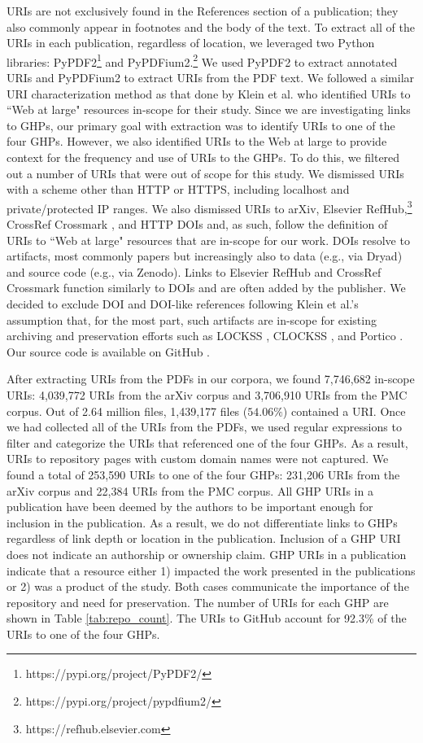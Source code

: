 URIs are not exclusively found in the References section of a publication; they also commonly appear in footnotes and the body of the text. To extract all of the URIs in each publication, regardless of location, we leveraged two Python libraries: PyPDF2\footnote{https://pypi.org/project/PyPDF2/} and PyPDFium2.\footnote{https://pypi.org/project/pypdfium2/} We used PyPDF2 to extract annotated URIs and PyPDFium2 to extract URIs from the PDF text. We followed a similar URI characterization method as that done by Klein et al. \cite{klein-plos2014} who identified URIs to ``Web at large" resources in-scope for their study. Since we are investigating links to GHPs, our primary goal with extraction was to identify URIs to one of the four GHPs. However, we also identified URIs to the Web at large to provide context for the frequency and use of URIs to the GHPs. To do this, we filtered out a number of URIs that were out of scope for this study. We dismissed URIs with a scheme other than HTTP or HTTPS, including localhost and private/protected IP ranges. We also dismissed URIs to arXiv, Elsevier RefHub,\footnote{https://refhub.elsevier.com} CrossRef Crossmark \cite{hendricks-crossref-2020}, and HTTP DOIs and, as such, follow the definition of URIs to ``Web at large" resources that are in-scope for our work. DOIs resolve to artifacts, most commonly papers but increasingly also to data (e.g., via Dryad) and source code (e.g., via Zenodo). Links to Elsevier RefHub and CrossRef Crossmark function similarly to DOIs and are often added by the publisher. We decided to exclude DOI and DOI-like references following Klein et al.'s assumption that, for the most part, such artifacts are in-scope for existing archiving and preservation efforts such as LOCKSS \cite{reich-dlib2001}, CLOCKSS \cite{reich-serials2008}, and Portico \cite{fenton-serials2006}. Our source code is available on GitHub \cite{Extract-URLs}.

After extracting URIs from the PDFs in our corpora, we found 7,746,682 in-scope URIs: 4,039,772 URIs from the arXiv corpus and 3,706,910 URIs from the PMC corpus. Out of 2.64 million files, 1,439,177 files ($54.06\%$) contained a URI. Once we had collected all of the URIs from the PDFs, we used regular expressions to filter and categorize the URIs that referenced one of the four GHPs. As a result, URIs to repository pages with custom domain names \cite{custom-domain} were not captured. We found a total of 253,590 URIs to one of the four GHPs: 231,206 URIs from the arXiv corpus and 22,384 URIs from the PMC corpus. All GHP URIs in a publication have been deemed by the authors to be important enough for inclusion in the publication. As a result, we do not differentiate links to GHPs regardless of link depth or location in the publication. Inclusion of a GHP URI does not indicate an authorship or ownership claim. GHP URIs in a publication indicate that a resource either 1) impacted the work presented in the publications or 2) was a product of the study. Both cases communicate the importance of the repository and need for preservation. The number of URIs for each GHP are shown in Table \ref{tab:repo_count}. The URIs to GitHub account for 92.3\% of the URIs to one of the four GHPs. 

